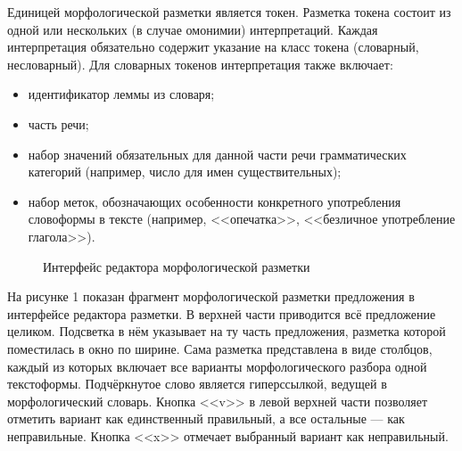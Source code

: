 \documentclass[a4paper]{article}
\begin{document}
Единицей морфологической разметки является токен. Разметка токена состоит из одной или нескольких (в случае омонимии) интерпретаций. Каждая интерпретация обязательно содержит указание на класс токена (словарный, несловарный). Для словарных токенов интерпретация также включает:
\begin{itemize}
\item идентификатор леммы из словаря;
\item часть речи;
\item набор значений обязательных для данной части речи грамматических категорий (например, число для имен существительных);
\item набор меток, обозначающих особенности конкретного употребления словоформы в тексте (например, <<опечатка>>, <<безличное употребление глагола>>).
\end{itemize}

\begin{figure}[h!]
\caption{Интерфейс редактора морфологической разметки}
\end{figure}

На рисунке 1 показан фрагмент морфологической разметки предложения в интерфейсе редактора разметки. В верхней части приводится всё предложение целиком. Подсветка в нём указывает на ту часть предложения, разметка которой поместилась в окно по ширине. Сама разметка представлена в виде столбцов, каждый из которых включает все варианты морфологического разбора одной текстоформы. Подчёркнутое слово является гиперссылкой, ведущей в морфологический словарь. Кнопка <<v>> в левой верхней части позволяет отметить вариант как единственный правильный, а все остальные — как неправильные. Кнопка <<x>> отмечает выбранный вариант как неправильный.
\end{document}
